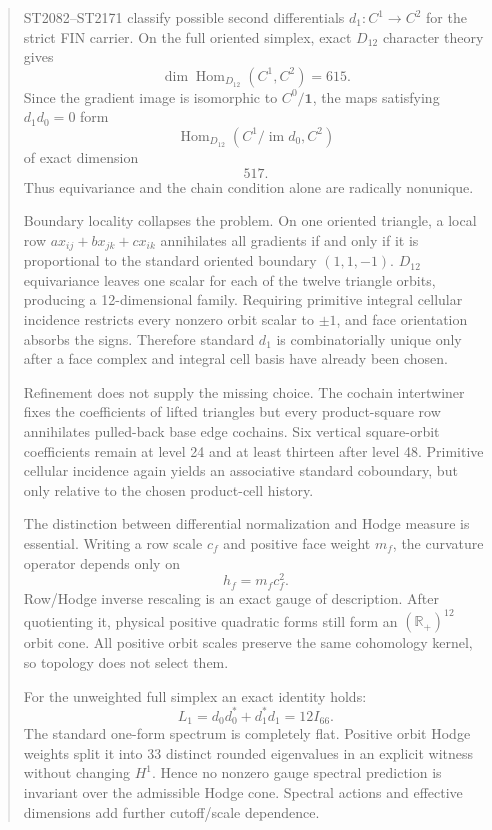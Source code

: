 \documentclass[11pt,a4paper]{article}
\begin{document}
\begin{abstract}
ST2082--ST2171 classify possible second differentials
$d_1:C^1\to C^2$ for the strict FIN carrier.  On the full oriented simplex,
exact $D_{12}$ character theory gives
\[
\dim\operatorname{Hom}_{D_{12}}(C^1,C^2)=615.
\]
Since the gradient image is isomorphic to $C^0/\mathbf1$, the maps satisfying
$d_1d_0=0$ form
\[
\operatorname{Hom}_{D_{12}}(C^1/\operatorname{im}d_0,C^2)
\]
of exact dimension
\[
\boxed{517}.
\]
Thus equivariance and the chain condition alone are radically nonunique.

Boundary locality collapses the problem.  On one oriented triangle, a local
row $a x_{ij}+b x_{jk}+c x_{ik}$ annihilates all gradients if and only if it is
proportional to the standard oriented boundary $(1,1,-1)$.  $D_{12}$
equivariance leaves one scalar for each of the twelve triangle orbits, producing
a 12-dimensional family.  Requiring primitive integral cellular incidence
restricts every nonzero orbit scalar to $\pm1$, and face orientation absorbs
the signs.  Therefore standard $d_1$ is combinatorially unique only after a
face complex and integral cell basis have already been chosen.

Refinement does not supply the missing choice.  The cochain intertwiner fixes
the coefficients of lifted triangles but every product-square row annihilates
pulled-back base edge cochains.  Six vertical square-orbit coefficients remain
at level 24 and at least thirteen after level 48.  Primitive cellular incidence
again yields an associative standard coboundary, but only relative to the
chosen product-cell history.

The distinction between differential normalization and Hodge measure is
essential.  Writing a row scale $c_f$ and positive face weight $m_f$, the
curvature operator depends only on
\[
h_f=m_fc_f^2.
\]
Row/Hodge inverse rescaling is an exact gauge of description.  After quotienting
it, physical positive quadratic forms still form an $(\mathbb R_+)^{12}$ orbit
cone.  All positive orbit scales preserve the same cohomology kernel, so
topology does not select them.

For the unweighted full simplex an exact identity holds:
\[
L_1=d_0d_0^*+d_1^*d_1=12I_{66}.
\]
The standard one-form spectrum is completely flat.  Positive orbit Hodge
weights split it into 33 distinct rounded eigenvalues in an explicit witness
without changing $H^1$.  Hence no nonzero gauge spectral prediction is invariant
over the admissible Hodge cone.  Spectral actions and effective dimensions add
further cutoff/scale dependence.


\end{abstract}
\end{document}
